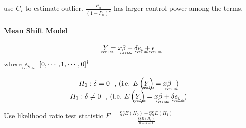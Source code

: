 \documentclass{article}
\begin{document}
\bigskip

use $C_{i}$ to estimate outlier. $\frac{P_{ii}}{\left( 1-P_{ii}\right) ^{2}}$
has larger control power among the terms.

\bigskip

\bigskip

\paragraph{Mean Shift Model}

\begin{equation*}
\underaccent{\wtilde}{Y}%
=x%
\underaccent{\wtilde}{\beta}%
+\delta 
\underaccent{\wtilde}{e}%
_{i}+%
\underaccent{\wtilde}{\epsilon}%
\end{equation*}%
where $%
\underaccent{\wtilde}{e}%
_{i}=\left[ 0,\cdots ,1,\cdots ,0\right] ^{\dagger }$

\begin{equation*}
\begin{array}{c}
H_{0}:\delta =0\text{, (i.e. }E\left( 
\underaccent{\wtilde}{Y}%
\right) =x%
\underaccent{\wtilde}{\beta}%
\text{)} \\ 
H_{1}:\delta \neq 0\text{, (i.e. }E\left( 
\underaccent{\wtilde}{Y}%
\right) =x%
\underaccent{\wtilde}{\beta}%
+\delta 
\underaccent{\wtilde}{e}%
_{i}\text{)}%
\end{array}%
\end{equation*}

\bigskip

Use likelihood ratio test statistic $F=\frac{\text{\c{S}\c{S}}E\left(
H_{0}\right) -\text{\c{S}\c{S}}E\left( H_{1}\right) }{\frac{\text{\c{S}\c{S}}%
E\left( H_{1}\right) }{n-k-1}}$
\end{document}
